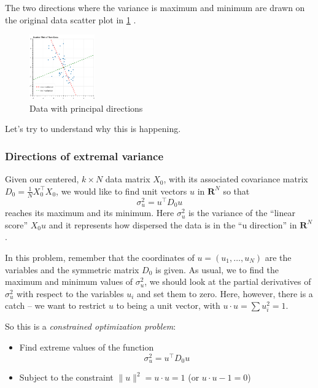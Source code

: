 \documentclass[
]{article}
\providecommand{\tightlist}{%
  \setlength{\itemsep}{0pt}\setlength{\parskip}{0pt}}
\begin{document}
The two directions where the variance is maximum and minimum are drawn
on the original data scatter plot in \cref{fig:pcaprincipal} .

\begin{figure}
\hypertarget{fig:pcaprincipal}{%
\centering
\includegraphics[width=0.25\textwidth,height=\textheight]{../img/PCAprincipal.png}
\caption{Data with principal directions}\label{fig:pcaprincipal}
}
\end{figure}

Let's try to understand why this is happening.

\hypertarget{directions-of-extremal-variance}{%
\subsubsection{Directions of extremal
variance}\label{directions-of-extremal-variance}}

Given our centered, \(k\times N\) data matrix \(X_{0}\), with its
associated covariance matrix
\(D_{0}=\frac{1}{N}X_{0}^{\intercal}X_{0}\), we would like to find unit
vectors \(u\) in \(\mathbf{R}^{N}\) so that \[
\sigma_{u}^{2} = u^{\intercal}D_{0}u
\] reaches its maximum and its minimum. Here \(\sigma_{u}^2\) is the
variance of the ``linear score'' \(X_{0}u\) and it represents how
dispersed the data is in the ``u direction'' in \(\mathbf{R}^{N}\).

In this problem, remember that the coordinates of
\(u=(u_1,\ldots, u_{N})\) are the variables and the symmetric matrix
\(D_{0}\) is given. As usual, we to find the maximum and minimum values
of \(\sigma_{u}^{2}\), we should look at the partial derivatives of
\(\sigma_{u}^{2}\) with respect to the variables \(u_{i}\) and set them
to zero. Here, however, there is a catch -- we want to restrict \(u\) to
being a unit vector, with \(u\cdot u =\sum u_{i}^2=1\).

So this is a \emph{constrained optimization problem}:

\begin{itemize}
\tightlist
\item
  Find extreme values of the function \[
  \sigma_{u}^{2} = u^{\intercal}D_{0}u
  \]
\item
  Subject to the constraint \(\|u\|^2 = u\cdot u=1\) (or
  \(u\cdot u-1=0\))
\end{itemize}
\end{document}
